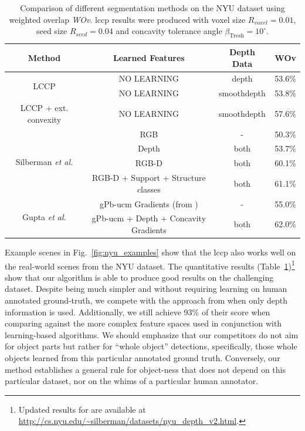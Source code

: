 \begin{table}
  \centering
  \begin{tabular}{c|c|c|c}
  Method & Learned Features & Depth Data  & WOv\\ \hline \hline
  \multirow{2}{*}{LCCP} & NO LEARNING & depth & 53.6\% \\ \cline{2-4}
                                           & NO LEARNING & smoothdepth & 53.8\% \\ \hline
  LCCP + ext. convexity & NO LEARNING & smoothdepth &  57.6\% \\ \hline \hline
  \multirow{4}{*}{Silberman \textit{et al.}\cite{Silberman:ECCV12}} & RGB  & - &  50.3\% \\ \cline{2-4}
                                           & Depth & both  & 53.7\% \\ \cline{2-4}
                                           & RGB-D & both  & 60.1\% \\ \cline{2-4}
                                           & RGB-D + Support + Structure classes & both & 61.1\% \\ \hline \hline
  \multirow{2}{*}{Gupta \textit{et al.}\cite{Gupta:CVPR2013}} & gPb-ucm Gradients (from \cite{Arbelaez:PAMI2011}) & - &  55.0\% \\ \cline{2-4}
                                           & gPb-ucm + Depth + Concavity Gradients & both & 62.0\% \\ \hline
  \end{tabular}
  \caption[Comparison of NYU Dataset Results]{Comparison of different segmentation methods on the NYU dataset using weighted overlap \textit{WOv}. \gls{lccp} results were produced with voxel size $R_{voxel} = 0.01$, seed size $R_{seed}=0.04$ and concavity tolerance angle $\beta_\text{Tresh}=10^\circ$.}
  \label{tab:res_lccp_nyu}
\end{table}

Example scenes in Fig.~\ref{fig:nyu_examples} show that the \gls{lccp} also works well on the real-world scenes from the NYU dataset. The quantitative results (Table~\ref{tab:res_lccp_nyu})\footnote{Updated results for \cite{Silberman:ECCV12} are available at \url{http://cs.nyu.edu/~silberman/datasets/nyu_depth_v2.html}.} show that our algorithm is able to produce good results on the challenging dataset. Despite being much simpler and without requiring learning on human annotated ground-truth, we compete with the approach from \cite{Silberman:ECCV12} when only depth information is used. Additionally, we still achieve 93\% of their score when comparing against the more complex feature spaces used in conjunction with learning-based algorithms. We should emphasize that our competitors do not aim for object parts but rather for ``whole object'' detections, specifically, those whole objects learned from this particular annotated ground truth. Conversely, our method establishes a general rule for object-ness that does not depend on this particular dataset, nor on the whims of a particular human annotator.

